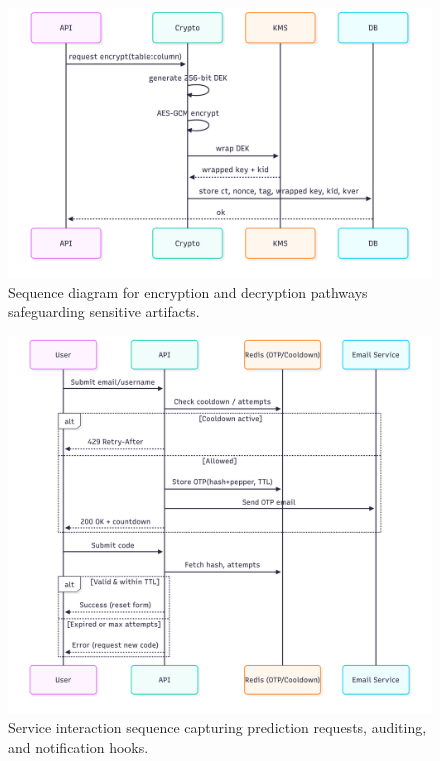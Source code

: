 \documentclass[conference]{IEEEtran}
\begin{document}
\begin{figure}[t]
  \centering
  \includegraphics[width=0.9\linewidth]{encryptiondecryption_sequence.png}
  \caption{Sequence diagram for encryption and decryption pathways safeguarding sensitive artifacts.}
  \label{fig:enc_sequence}
\end{figure}

\begin{figure}[t]
  \centering
  \includegraphics[width=0.9\linewidth]{sequence_of_interactions.png}
  \caption{Service interaction sequence capturing prediction requests, auditing, and notification hooks.}
  \label{fig:sequence_interactions}
\end{figure}
\end{document}
